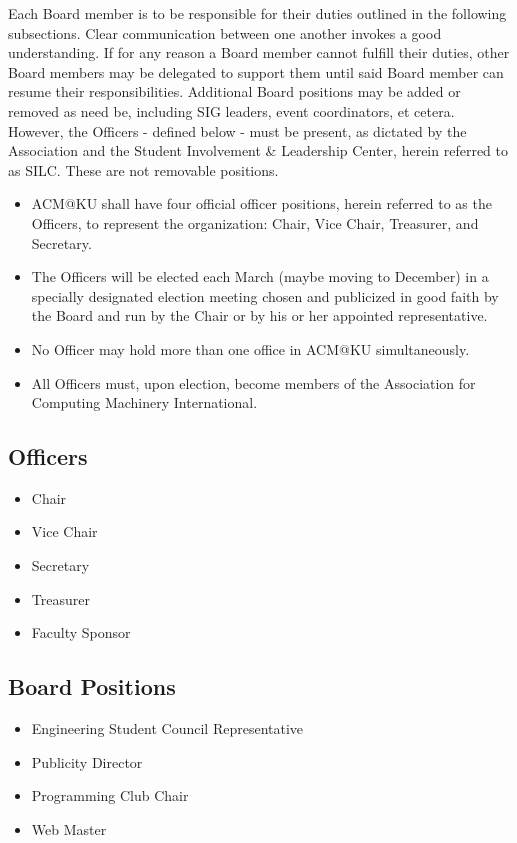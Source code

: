 Each Board member is to be responsible for their duties outlined in the following
subsections. Clear communication between one another invokes a good understanding.
If for any reason a Board member cannot fulfill their duties, other Board members
may be delegated to support them until said Board member can resume their
responsibilities. Additional Board positions may be added or removed as need be,
including SIG leaders, event coordinators, et cetera. However, the Officers
- defined below - must be present, as dictated by the Association and the Student
Involvement & Leadership Center, herein referred to as SILC. These are not
removable positions.
\begin{itemize}
  \item ACM@KU shall have four official officer positions, herein referred to as
        the Officers, to represent the organization:
        Chair, Vice Chair, Treasurer, and Secretary.
  \item The Officers will be elected each March (maybe moving to December) in a
        specially designated election meeting chosen and publicized in good faith
        by the Board and run by the Chair or by his or her appointed representative.
  \item No Officer may hold more than one office in ACM@KU simultaneously.
  \item All Officers must, upon election, become members of the Association for
        Computing Machinery International.
\end{itemize}

\subsection{Officers}
\label{subsec:subsec01}

\begin{itemize}
  \item Chair
  \item Vice Chair
  \item Secretary
  \item Treasurer
  \item Faculty Sponsor
\end{itemize}

\subsection{Board Positions}
\label{subsec:subsec02}

\begin{itemize}
  \item Engineering Student Council Representative
  \item Publicity Director
  \item Programming Club Chair
  \item Web Master
\end{itemize}

